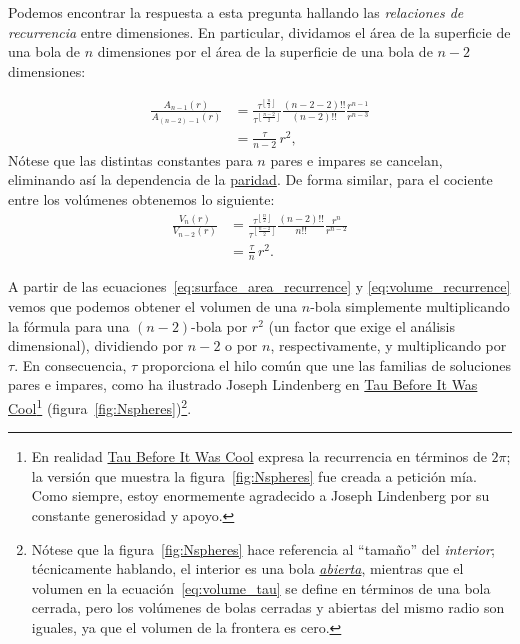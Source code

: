 Podemos encontrar la respuesta a esta pregunta hallando las \emph{relaciones de recurrencia} entre dimensiones. En particular, dividamos el área de la superficie de una bola de $n$ dimensiones por el área de la superficie de una bola de $n-2$ dimensiones:

\begin{equation}
  \label{eq:surface_area_recurrence}
  \begin{split}
  \frac{A_{n-1}(r)}{A_{(n-2)-1}(r)} & =
  \frac{\tau^{\left\lfloor \frac{n}{2} \right\rfloor}}{\tau^{\left\lfloor \frac{n-2}{2} \right\rfloor}}
  \frac{(n-2-2)!!}{(n-2)!!}
  \frac{r^{n-1}}{r^{n-3}}
  \\ & = \frac{\tau}{n-2}\,r^2,
  \end{split}
\end{equation}
Nótese que las distintas constantes para $n$ pares e impares se cancelan, eliminando así la dependencia de la \href{https://es.wikipedia.org/wiki/N%C3%BAmeros_pares_e_impares}{paridad}. De forma similar, para el cociente entre los volúmenes obtenemos lo siguiente:
\begin{equation}
\label{eq:volume_recurrence}
\begin{split}
\frac{V_n(r)}{V_{n-2}(r)} & =
\frac{\tau^{\left\lfloor \frac{n}{2} \right\rfloor}}{\tau^{\left\lfloor \frac{n-2}{2} \right\rfloor}}
\frac{(n-2)!!}{n!!}
\frac{r^{n}}{r^{n-2}}
\\ & = \frac{\tau}{n}\,r^2.
\end{split}
\end{equation}

A partir de las ecuaciones~\eqref{eq:surface_area_recurrence} y \eqref{eq:volume_recurrence} vemos que podemos obtener el volumen de una $n$-bola simplemente multiplicando la fórmula para una $(n-2)$-bola por $r^2$ (un factor que exige el análisis dimensional), dividiendo por $n-2$ o por $n$, respectivamente, y multiplicando por $\tau$. En consecuencia, $\tau$ proporciona el hilo común que une las familias de soluciones pares e impares, como ha ilustrado Joseph Lindenberg en \href{http://sites.google.com/site/taubeforeitwascool/}{Tau Before It Was Cool}\footnote{En realidad \href{https://sites.google.com/site/taubeforeitwascool/}{Tau Before It Was Cool} expresa la recurrencia en términos de $2\pi$; la versión que muestra la figura~\ref{fig:Nspheres} fue creada a petición mía. Como siempre, estoy enormemente agradecido a Joseph Lindenberg por su constante generosidad y apoyo.} (figura~\ref{fig:Nspheres})\footnote{Nótese que la figura~\ref{fig:Nspheres} hace referencia al ``tamaño'' del \emph{interior}; técnicamente hablando, el interior es una bola \href{https://es.wikipedia.org/wiki/Conjunto_abierto}{\emph{abierta}}, mientras que el volumen en la ecuación~\eqref{eq:volume_tau} se define en términos de una bola cerrada, pero los volúmenes de bolas cerradas y abiertas del mismo radio son iguales, ya que el volumen de la frontera es cero.}.

